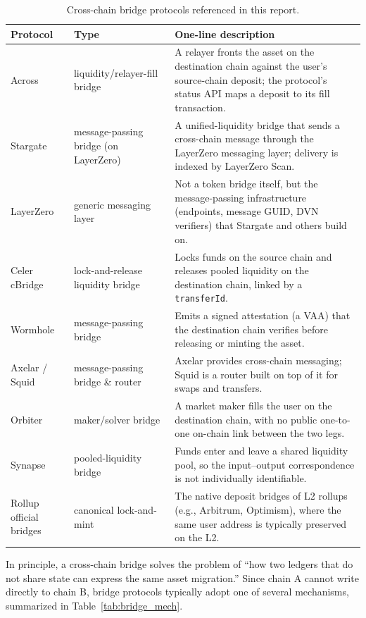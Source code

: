 \documentclass[12pt,a4paper]{article}
\begin{document}
\begin{table}[htbp]
\centering
\caption{Cross-chain bridge protocols referenced in this report.}
\label{tab:bridge_who}
\small
\begin{tabularx}{\textwidth}{l l Y}
\toprule
\textbf{Protocol} & \textbf{Type} & \textbf{One-line description} \\
\midrule
Across & liquidity/relayer-fill bridge & A relayer fronts the asset on the destination chain against the user's source-chain deposit; the protocol's status API maps a deposit to its fill transaction. \\
Stargate & message-passing bridge (on LayerZero) & A unified-liquidity bridge that sends a cross-chain message through the LayerZero messaging layer; delivery is indexed by LayerZero Scan. \\
LayerZero & generic messaging layer & Not a token bridge itself, but the message-passing infrastructure (endpoints, message GUID, DVN verifiers) that Stargate and others build on. \\
Celer cBridge & lock-and-release liquidity bridge & Locks funds on the source chain and releases pooled liquidity on the destination chain, linked by a \texttt{transferId}. \\
Wormhole & message-passing bridge & Emits a signed attestation (a VAA) that the destination chain verifies before releasing or minting the asset. \\
Axelar / Squid & message-passing bridge \& router & Axelar provides cross-chain messaging; Squid is a router built on top of it for swaps and transfers. \\
Orbiter & maker/solver bridge & A market maker fills the user on the destination chain, with no public one-to-one on-chain link between the two legs. \\
Synapse & pooled-liquidity bridge & Funds enter and leave a shared liquidity pool, so the input--output correspondence is not individually identifiable. \\
Rollup official bridges & canonical lock-and-mint & The native deposit bridges of L2 rollups (e.g., Arbitrum, Optimism), where the same user address is typically preserved on the L2. \\
\bottomrule
\end{tabularx}
\end{table}

In principle, a cross-chain bridge solves the problem of ``how two ledgers that do not share state can express the same asset migration.'' Since chain A cannot write directly to chain B, bridge protocols typically adopt one of several mechanisms, summarized in Table~\ref{tab:bridge_mech}.
\end{document}
